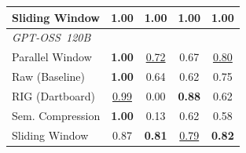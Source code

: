 \begin{table}[htbp]
\begin{tabular}{lccc|c}
    Sliding Window     & \textbf{1.00} & \textbf{1.00}    & \textbf{1.00}    & \textbf{1.00} \\
    \midrule
    \multicolumn{5}{l}{\textit{GPT-OSS~120B}} \\
    Parallel Window    & \textbf{1.00}    & \underline{0.72} & 0.67          & \underline{0.80} \\
    Raw (Baseline)     & \textbf{1.00}    & 0.64             & 0.62          & 0.75 \\
    RIG (Dartboard)    & \underline{0.99} & 0.00             & \textbf{0.88} & 0.62 \\
    Sem. Compression   & \textbf{1.00}    & 0.13             & 0.62          & 0.58 \\
    Sliding Window     & 0.87             & \textbf{0.81}    & \underline{0.79} & \textbf{0.82} \\
    \bottomrule
    \end{tabular}
\end{table}


